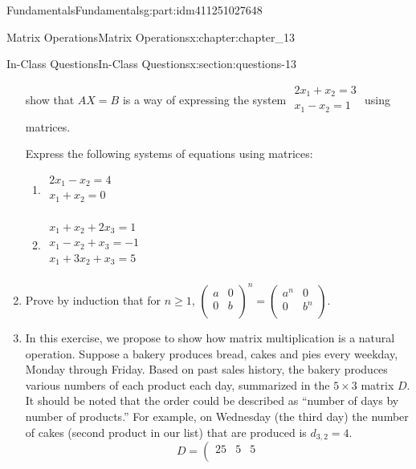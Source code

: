 \documentclass[oneside,10pt,]{book}
\numberwithin{equation}{section}
\begin{document}
\begin{partptx}{Fundamentals}{}{Fundamentals}{}{}{g:part:idm411251027648}
\begin{chapterptx}{Matrix Operations}{}{Matrix Operations}{}{}{x:chapter:chapter_13}
\begin{sectionptx}{In-Class Questions}{}{In-Class Questions}{}{}{x:section:questions-13}
\begin{enumerate}[label=\arabic*.]
show that \(A X =B\) is a way of expressing the system \(\begin{array}{c}2x_1 + x_2 = 3\\ x_1 - x_2= 1\\
\end{array}\)  using matrices.%
\par
Express the following systems of equations using matrices:%
\par
%
\begin{multicols}{2}
\begin{enumerate}[label=(\alph*)]
\item{}\(\begin{array}{c}
2 x_1- x_2= 4\\
x_1+ x_2= 0\\
\end{array}\)%
\item{}\(\begin{array}{c}
x_1+ x_2+ 2 x_3= 1\\
x_1- x_2+ x_3= -1\\
x_1+ 3 x_2+x_3= 5\\
\end{array}\)%
\end{enumerate}
\end{multicols}
%
\item{}Prove by induction that for \(n \geq 1\), \(\left(
\begin{array}{cc}
a & 0 \\
0 & b \\
\end{array}
\right)^n= \left(
\begin{array}{cc}
a^n & 0 \\
0 & b^n \\
\end{array}
\right)\).%
\item{}In this exercise, we propose to show how matrix multiplication is a natural operation.  Suppose a bakery produces bread, cakes and pies every weekday, Monday through Friday. Based on past sales history, the bakery produces various numbers of each product each day, summarized in the \(5 \times 3\) matrix \(D\).  It should be noted that the order could be described as ``number of days by number of products.''   For example, on Wednesday (the third day) the number of cakes (second product in our list) that are produced  is  \(d_{3,2} = 4\).%
\begin{equation*}
D =\left(
\begin{array}{ccc}
25 & 5 & 5 \\

\end{array}
\end{equation*}
\end{enumerate}
\end{sectionptx}
\end{chapterptx}
\end{partptx}
\end{document}
